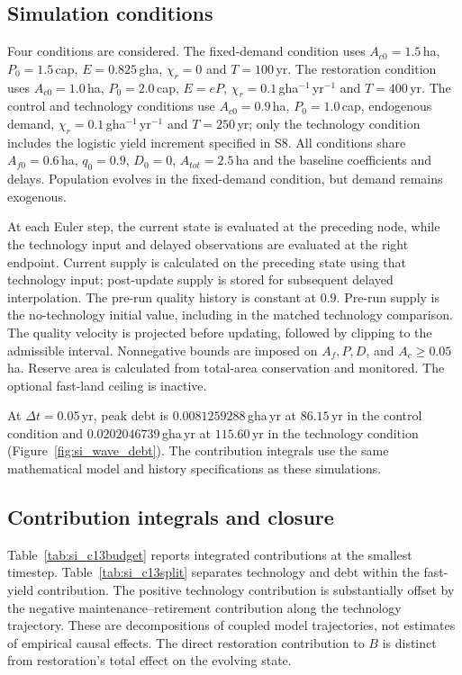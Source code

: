 \documentclass[11pt,a4paper]{article}
\begin{document}
\subsection{Simulation conditions}

Four conditions are considered. The fixed-demand condition uses $A_{c0}=1.5$\,ha, $P_0=1.5$\,cap, $E=0.825$\,gha, $\chi_r=0$ and $T=100$\,yr. The restoration condition uses $A_{c0}=1.0$\,ha, $P_0=2.0$\,cap, $E=eP$, $\chi_r=0.1$\,gha$^{-1}$\,yr$^{-1}$ and $T=400$\,yr. The control and technology conditions use $A_{c0}=0.9$\,ha, $P_0=1.0$\,cap, endogenous demand, $\chi_r=0.1$\,gha$^{-1}$\,yr$^{-1}$ and $T=250$\,yr; only the technology condition includes the logistic yield increment specified in S8. All conditions share $A_{f0}=0.6$\,ha, $q_0=0.9$, $D_0=0$, $A_{tot}=2.5$\,ha and the baseline coefficients and delays. Population evolves in the fixed-demand condition, but demand remains exogenous.

At each Euler step, the current state is evaluated at the preceding node, while the technology input and delayed observations are evaluated at the right endpoint. Current supply is calculated on the preceding state using that technology input; post-update supply is stored for subsequent delayed interpolation. The pre-run quality history is constant at $0.9$. Pre-run supply is the no-technology initial value, including in the matched technology comparison. The quality velocity is projected before updating, followed by clipping to the admissible interval. Nonnegative bounds are imposed on $A_f,P,D$, and $A_c\ge0.05$\,ha. Reserve area is calculated from total-area conservation and monitored. The optional fast-land ceiling is inactive.

At $\Delta t=0.05$\,yr, peak debt is $0.0081259288$\,gha\,yr at $86.15$\,yr in the control condition and $0.0202046739$\,gha\,yr at $115.60$\,yr in the technology condition (Figure~\ref{fig:si_wave_debt}). The contribution integrals use the same mathematical model and history specifications as these simulations.

\subsection{Contribution integrals and closure}

Table~\ref{tab:si_c13budget} reports integrated contributions at the smallest timestep. Table~\ref{tab:si_c13split} separates technology and debt within the fast-yield contribution. The positive technology contribution is substantially offset by the negative maintenance--retirement contribution along the technology trajectory. These are decompositions of coupled model trajectories, not estimates of empirical causal effects. The direct restoration contribution to $B$ is distinct from restoration's total effect on the evolving state.
\end{document}
